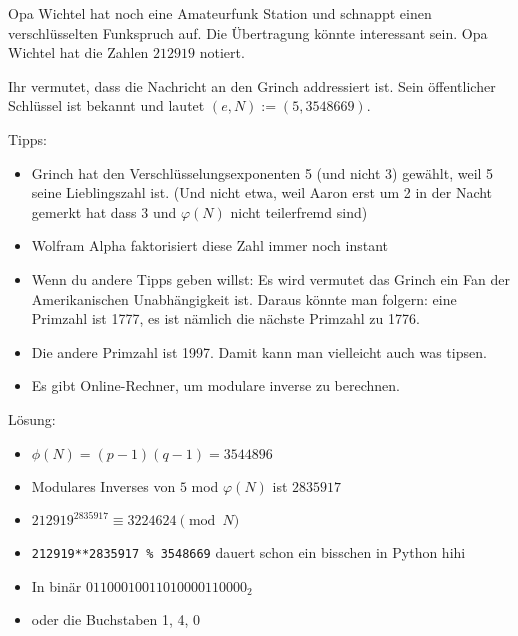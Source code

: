 \documentclass{article}
\begin{document}
Opa Wichtel hat noch eine Amateurfunk Station und schnappt einen verschlüsselten Funkspruch auf. Die Übertragung könnte interessant sein. Opa Wichtel hat die Zahlen $212919$ notiert.

Ihr vermutet, dass die Nachricht an den Grinch addressiert ist. Sein öffentlicher Schlüssel ist bekannt und lautet $(e, N) := (5, 3 548 669)$.

Tipps:
\begin{itemize}
    \item Grinch hat den Verschlüsselungsexponenten 5 (und nicht 3) gewählt, weil 5 seine Lieblingszahl ist. (Und nicht etwa, weil Aaron erst um 2 in der Nacht gemerkt hat dass $3$ und $\varphi(N)$ nicht teilerfremd sind)
    \item Wolfram Alpha faktorisiert diese Zahl immer noch instant
    \item Wenn du andere Tipps geben willst: Es wird vermutet das Grinch ein Fan der Amerikanischen Unabhängigkeit ist. Daraus könnte man folgern: eine Primzahl ist 1777, es ist nämlich die nächste Primzahl zu 1776.
    \item Die andere Primzahl ist 1997. Damit kann man vielleicht auch was tipsen.
    \item Es gibt Online-Rechner, um modulare inverse zu berechnen.
\end{itemize}
Lösung:
\begin{itemize}
    \item $\phi(N) = (p-1)(q-1) = 3544896$
    \item Modulares Inverses von $5$ mod $\varphi(N)$ ist $2835917$
    \item $212919^{2835917} \equiv 3224624 \pmod N$ 
    \item \texttt{212919**2835917 \% 3548669} dauert schon ein bisschen in Python hihi
    \item In binär $01100010 0110100 00110000_2$
    \item oder die Buchstaben 1, 4, 0
\end{itemize}
\end{document}
